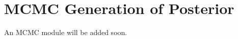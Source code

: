 \documentclass[main.tex]{subfiles}
\begin{document}
\setcounter{section}{5}
\section{MCMC Generation of Posterior}\label{sec:mcmc}

An MCMC module will be added soon.
\end{document}
